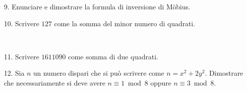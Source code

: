 \item{9.} Enunciare e dimostrare la formula di inversione di M\"obius.

\vv


\item{10.} Scrivere $127$ come la somma del minor numero di quadrati.

\ve\ \vs


\item{11.} Scrivere $1611090$ come somma di due quadrati.

\vss

\item{12.} Sia $n$ un numero dispari che si pu\`{o} scrivere
come $n=x^2+2y^2$. Dimostrare che necessariamente si deve avere
$n\equiv1\bmod8$ oppure $n\equiv3\bmod8$.
 \vv

\ \vst\vskip-8mm

 \bye
